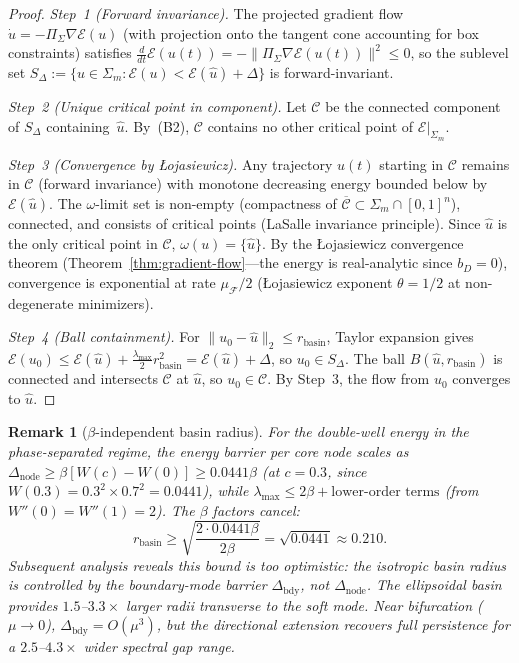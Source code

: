 \documentclass[lettersize,journal]{IEEEtran}
\newtheorem{remark}{Remark}
\begin{document}
\begin{proof}
\emph{Step~1 (Forward invariance).} The projected gradient flow $\dot{u} = -\Pi_\Sigma \nabla\mathcal{E}(u)$ (with projection onto the tangent cone accounting for box constraints) satisfies $\frac{d}{dt}\mathcal{E}(u(t)) = -\|\Pi_\Sigma \nabla\mathcal{E}(u(t))\|^2 \leq 0$, so the sublevel set $S_\Delta := \{u \in \Sigma_m : \mathcal{E}(u) < \mathcal{E}(\hat{u}) + \Delta\}$ is forward-invariant.

\emph{Step~2 (Unique critical point in component).} Let $\mathcal{C}$ be the connected component of $S_\Delta$ containing~$\hat{u}$. By~(B2), $\mathcal{C}$ contains no other critical point of $\mathcal{E}|_{\Sigma_m}$.

\emph{Step~3 (Convergence by \L{}ojasiewicz).} Any trajectory $u(t)$ starting in $\mathcal{C}$ remains in $\mathcal{C}$ (forward invariance) with monotone decreasing energy bounded below by $\mathcal{E}(\hat{u})$. The $\omega$-limit set is non-empty (compactness of $\overline{\mathcal{C}} \subset \Sigma_m \cap [0,1]^n$), connected, and consists of critical points (LaSalle invariance principle). Since $\hat{u}$ is the only critical point in $\mathcal{C}$, $\omega(u) = \{\hat{u}\}$. By the \L{}ojasiewicz convergence theorem (Theorem~\ref{thm:gradient-flow}---the energy is real-analytic since $b_D = 0$), convergence is exponential at rate $\mu_{\mathcal{F}}/2$ (\L{}ojasiewicz exponent $\theta = 1/2$ at non-degenerate minimizers).

\emph{Step~4 (Ball containment).} For $\|u_0 - \hat{u}\|_2 \leq r_{\mathrm{basin}}$, Taylor expansion gives $\mathcal{E}(u_0) \leq \mathcal{E}(\hat{u}) + \frac{\lambda_{\max}}{2} r_{\mathrm{basin}}^2 = \mathcal{E}(\hat{u}) + \Delta$, so $u_0 \in S_\Delta$. The ball $B(\hat{u}, r_{\mathrm{basin}})$ is connected and intersects $\mathcal{C}$ at $\hat{u}$, so $u_0 \in \mathcal{C}$. By Step~3, the flow from $u_0$ converges to $\hat{u}$.
\end{proof}

\begin{remark}[{$\beta$-independent basin radius}]
\label{rmk:basin-radius}
For the double-well energy in the phase-separated regime, the energy barrier per core node scales as $\Delta_{\mathrm{node}} \geq \beta[W(c) - W(0)] \geq 0.0441\beta$ (at $c = 0.3$, since $W(0.3) = 0.3^2 \times 0.7^2 = 0.0441$), while $\lambda_{\max} \leq 2\beta + \text{lower-order terms}$ (from $W''(0) = W''(1) = 2$). The $\beta$ factors cancel:
\[
r_{\mathrm{basin}} \geq \sqrt{\frac{2 \cdot 0.0441\beta}{2\beta}} = \sqrt{0.0441} \approx 0.210.
\]
Subsequent analysis reveals this bound is too optimistic: the isotropic basin radius is controlled by the boundary-mode barrier $\Delta_{\mathrm{bdy}}$, not $\Delta_{\mathrm{node}}$. The ellipsoidal basin provides $1.5$--$3.3\times$ larger radii transverse to the soft mode. Near bifurcation ($\mu \to 0$), $\Delta_{\mathrm{bdy}} = O(\mu^3)$, but the directional extension recovers full persistence for a $2.5$--$4.3\times$ wider spectral gap range.
\end{remark}
\end{document}
